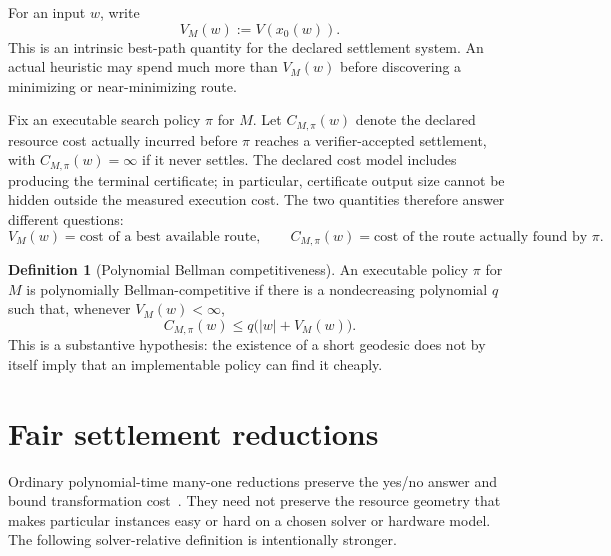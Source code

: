 \documentclass[11pt]{article}
\theoremstyle{definition}
\newtheorem{definition}[theorem]{Definition}
\begin{document}
For an input $w$, write
\[
V_M(w):=V(x_0(w)).
\]
This is an intrinsic best-path quantity for the declared settlement system. An actual heuristic may spend much more than $V_M(w)$ before discovering a minimizing or near-minimizing route.

Fix an executable search policy $\pi$ for $M$. Let $C_{M,\pi}(w)$ denote the declared resource cost actually incurred before $\pi$ reaches a verifier-accepted settlement, with $C_{M,\pi}(w)=\infty$ if it never settles. The declared cost model includes producing the terminal certificate; in particular, certificate output size cannot be hidden outside the measured execution cost. The two quantities therefore answer different questions:
\[
V_M(w)=\text{cost of a best available route},\qquad
C_{M,\pi}(w)=\text{cost of the route actually found by }\pi.
\]

\begin{definition}[Polynomial Bellman competitiveness]\label{def:bellman-competitive}
An executable policy $\pi$ for $M$ is polynomially Bellman-competitive if there is a nondecreasing polynomial $q$ such that, whenever $V_M(w)<\infty$,
\[
C_{M,\pi}(w)\le q\bigl(|w|+V_M(w)\bigr).
\]
This is a substantive hypothesis: the existence of a short geodesic does not by itself imply that an implementable policy can find it cheaply.
\end{definition}

\section{Fair settlement reductions}
Ordinary polynomial-time many-one reductions preserve the yes/no answer and bound transformation cost~\cite{Cook1971,Karp1972}. They need not preserve the resource geometry that makes particular instances easy or hard on a chosen solver or hardware model. The following solver-relative definition is intentionally stronger.
\end{document}
